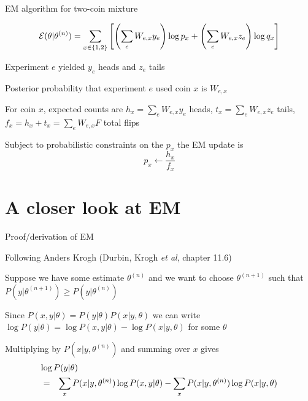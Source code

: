 \documentclass{beamer}
\begin{document}
\begin{frame}{EM algorithm for two-coin mixture}

\small
\[
{\cal E}(\theta|\theta^{(n)}) = \sum_{x \in \{1,2\}} \left[ \left( \sum_e W_{e,x} y_e \right) \log p_x + \left( \sum_e W_{e,x} z_e \right) \log q_x \right]
\]
\normalsize

\itemb
\item Experiment $e$ yielded $y_e$ heads and $z_e$ tails
\item Posterior probability that experiment $e$ used coin $x$ is $W_{e,x}$
\item For coin $x$, \alert{expected counts} are $h_x = \sum_e W_{e,x} y_e$ heads, $t_x = \sum_e W_{e,x} z_e$ tails, $f_x = h_x+t_x = \sum_e W_{e,x} F$ total flips
\iteme

Subject to probabilistic constraints on the $p_x$ the EM update is
\[
p_x \leftarrow \frac{h_x}{f_x}
\]

\end{frame}




\section{A closer look at EM}

\begin{frame}{Proof/derivation of EM}

 Following Anders Krogh (Durbin, Krogh {\em et al}, chapter 11.6)
  \itemb
  \item Suppose we have some estimate $\theta^{(n)}$ and we want to choose $\theta^{(n+1)}$ such that $P(y|\theta^{(n+1)}) \geq P(y|\theta^{(n)})$
  \item Since $P(x,y|\theta) = P(y|\theta) P(x|y,\theta)$ we can write $\log P(y|\theta) = \log P(x,y|\theta) - \log P(x|y,\theta)$ for some $\theta$
  \item Multiplying by $P(x|y,\theta^{(n)})$ and summing over $x$ gives
\begin{eqnarray*}
\lefteqn{\log P(y|\theta)} \\
& = & \sum_x P(x|y,\theta^{(n)}) \log P(x,y|\theta) - \sum_x P(x|y,\theta^{(n)}) \log P(x|y,\theta)
\end{eqnarray*}
 \iteme

\end{frame}
\end{document}
